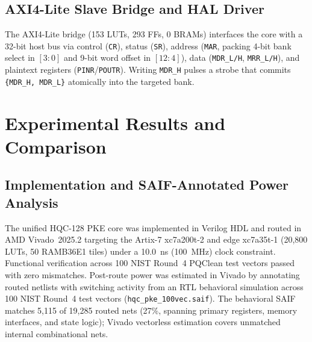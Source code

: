 \documentclass[journal]{IEEEtran}
\begin{document}
\subsection{AXI4-Lite Slave Bridge and HAL Driver}
The AXI4-Lite bridge (153 LUTs, 293 FFs, 0 BRAMs) interfaces the core with a 32-bit host bus via control (\texttt{CR}), status (\texttt{SR}), address (\texttt{MAR}, packing 4-bit bank select in $[3:0]$ and 9-bit word offset in $[12:4]$), data (\texttt{MDR\_L/H}, \texttt{MRR\_L/H}), and plaintext registers (\texttt{PINR}/\texttt{POUTR}). Writing \texttt{MDR\_H} pulses a strobe that commits \texttt{\{MDR\_H, MDR\_L\}} atomically into the targeted bank.

\section{Experimental Results and Comparison}

\subsection{Implementation and SAIF-Annotated Power Analysis}
The unified HQC-128 PKE core was implemented in Verilog HDL and routed in AMD Vivado~2025.2 targeting the Artix-7 xc7a200t-2 and edge xc7a35t-1 (20,800 LUTs, 50 RAMB36E1 tiles) under a 10.0~ns (100~MHz) clock constraint. Functional verification across 100 NIST Round~4 PQClean test vectors passed with zero mismatches. Post-route power was estimated in Vivado by annotating routed netlists with switching activity from an RTL behavioral simulation across 100 NIST Round~4 test vectors (\texttt{hqc\_pke\_100vec.saif}). The behavioral SAIF matches 5,115 of 19,285 routed nets (27\%, spanning primary registers, memory interfaces, and state logic); Vivado vectorless estimation covers unmatched internal combinational nets.
\end{document}
